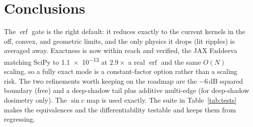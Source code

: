 \documentclass[11pt]{article}
\newcommand{\erf}{\ensuremath{\operatorname{erf}}}
\begin{document}
\section{Conclusions}

The \erf{} gate is the right default: it reduces exactly to the current kernels
in the off, convex, and geometric limits, and the only physics it drops (lit
ripples) is averaged away. Exactness is now within reach and verified, the JAX
Faddeeva matching SciPy to \num{1.1e-13} at $2.9\times$ a real \erf{} and the
same $O(N)$ scaling, so a fully exact mode is a constant-factor option rather
than a scaling risk. The two refinements worth keeping on the roadmap are the
$-6$\,dB squared boundary (free) and a deep-shadow tail plus additive multi-edge
(for deep-shadow dosimetry only). The $\sin c$ map is used exactly. The suite in
Table~\ref{tab:tests} makes the equivalences and the differentiability testable
and keeps them from regressing.
\end{document}

